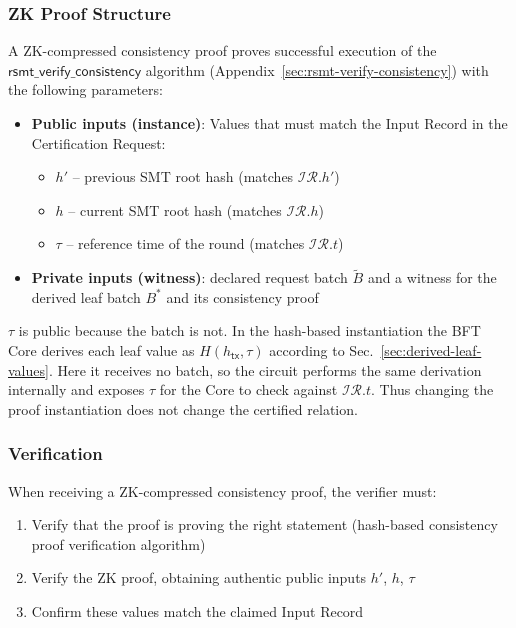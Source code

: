 \subsubsection{ZK Proof Structure}

A ZK-compressed consistency proof proves successful execution of the $\mathsf{rsmt\_verify\_consistency}$ algorithm (Appendix~\ref{sec:rsmt-verify-consistency}) with the following parameters:

\begin{itemize}
	\item \textbf{Public inputs (instance)}: Values that must match the Input Record in the Certification Request:
	\begin{itemize}
		\item $h'$ -- previous SMT root hash (matches $\mathcal{IR}.h'$)
		\item $h$ -- current SMT root hash (matches $\mathcal{IR}.h$)
		\item $\tau$ -- reference time of the round (matches $\mathcal{IR}.t$)
	\end{itemize}
	\item \textbf{Private inputs (witness)}: declared request batch $\widetilde B$ and a witness for the derived leaf batch $B^*$ and its consistency proof
\end{itemize}

$\tau$ is public because the batch is not. In the hash-based instantiation the BFT Core derives each leaf value as $H(h_\mathsf{tx},\tau)$ according to Sec.~\ref{sec:derived-leaf-values}. Here it receives no batch, so the circuit performs the same derivation internally and exposes $\tau$ for the Core to check against $\mathcal{IR}.t$. Thus changing the proof instantiation does not change the certified relation.

\subsubsection{Verification}

When receiving a ZK-compressed consistency proof, the verifier must:
\begin{enumerate}
	\item Verify that the proof is proving the right statement (hash-based consistency proof verification algorithm)
	\item Verify the ZK proof, obtaining authentic public inputs $h'$, $h$, $\tau$
	\item Confirm these values match the claimed Input Record
\end{enumerate}


